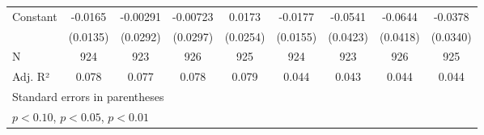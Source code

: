 {\begin{tabular}{l*{8}{c}}
Constant            &     -0.0165         &    -0.00291         &    -0.00723         &      0.0173         &     -0.0177         &     -0.0541         &     -0.0644         &     -0.0378         \\
                    &    (0.0135)         &    (0.0292)         &    (0.0297)         &    (0.0254)         &    (0.0155)         &    (0.0423)         &    (0.0418)         &    (0.0340)         \\
\hline
N                   &         924         &         923         &         926         &         925         &         924         &         923         &         926         &         925         \\
Adj. R²             &       0.078         &       0.077         &       0.078         &       0.079         &       0.044         &       0.043         &       0.044         &       0.044         \\
\hline\hline
\multicolumn{9}{l}{\footnotesize Standard errors in parentheses}\\
\multicolumn{9}{l}{\footnotesize \sym{*} \(p<0.10\), \sym{**} \(p<0.05\), \sym{***} \(p<0.01\)}\\
\end{tabular}
}
